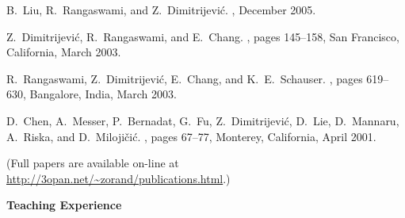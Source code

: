 \documentclass[10pt]{article}
\renewcommand{\section}[1]{ \vspace{10pt}\begin{flushleft}{\hspace{-0.2in }\Large\bf
    #1}\end{flushleft}\nopagebreak }
\begin{document}
\begin{thebibliography}{22.}
 B.~Liu, R.~Rangaswami, and Z.~Dimitrijevi\'c. 
 , December 2005.

 Z.~Dimitrijevi\'c, R.~Rangaswami, and E.~Chang.
 , 
 pages 145--158, San Francisco, California, March 2003.

 R.~Rangaswami, Z.~Dimitrijevi\'c, E.~Chang, and K.~E.~Schauser. 
 , pages 619--630, Bangalore, India, March 2003.


 D.~Chen, A.~Messer, P.~Bernadat, G.~Fu, Z.~Dimitrijevi\'c, 
 D.~Lie, D.~Mannaru, A.~Riska, and D.~Miloji\v{c}i\'c.
 , pages 67--77, Monterey, California, April 2001.
\end{thebibliography}




\vspace{-5pt}
\hspace{0.25in} (Full papers are available on-line at 
\url{http://3opan.net/~zorand/publications.html}.)


\section{Teaching Experience}
\end{document}

